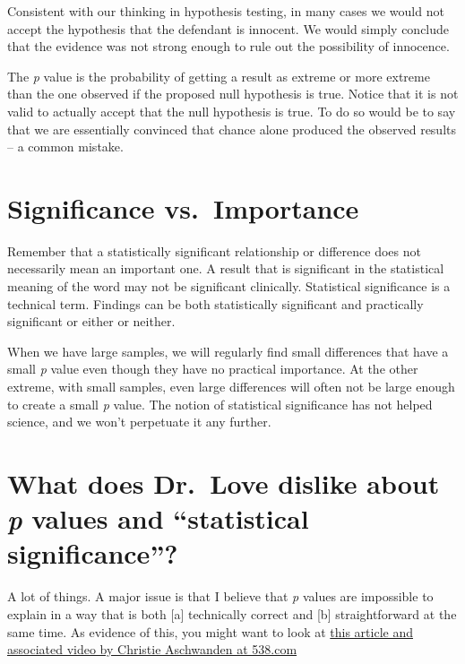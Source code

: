 \documentclass[
]{book}
\begin{document}
Consistent with our thinking in hypothesis testing, in many cases we would not accept the hypothesis that the defendant is innocent. We would simply conclude that the evidence was not strong enough to rule out the possibility of innocence.

The \emph{p} value is the probability of getting a result as extreme or more extreme than the one observed if the proposed null hypothesis is true. Notice that it is not valid to actually accept that the null hypothesis is true. To do so would be to say that we are essentially convinced that chance alone produced the observed results -- a common mistake.

\hypertarget{significance-vs.-importance}{%
\section{Significance vs.~Importance}\label{significance-vs.-importance}}

Remember that a statistically significant relationship or difference does not necessarily mean an important one. A result that is significant in the statistical meaning of the word may not be significant clinically. Statistical significance is a technical term. Findings can be both statistically significant and practically significant or either or neither.

When we have large samples, we will regularly find small differences that have a small \emph{p} value even though they have no practical importance. At the other extreme, with small samples, even large differences will often not be large enough to create a small \emph{p} value. The notion of statistical significance has not helped science, and we won't perpetuate it any further.

\hypertarget{what-does-dr.-love-dislike-about-p-values-and-statistical-significance}{%
\section{\texorpdfstring{What does Dr.~Love dislike about \emph{p} values and ``statistical significance''?}{What does Dr.~Love dislike about p values and ``statistical significance''?}}\label{what-does-dr.-love-dislike-about-p-values-and-statistical-significance}}

A lot of things. A major issue is that I believe that \emph{p} values are impossible to explain in a way that is both {[}a{]} technically correct and {[}b{]} straightforward at the same time. As evidence of this, you might want to look at \href{http://fivethirtyeight.com/features/statisticians-found-one-thing-they-can-agree-on-its-time-to-stop-misusing-p-values/}{this article and associated video by Christie Aschwanden at 538.com}
\end{document}
